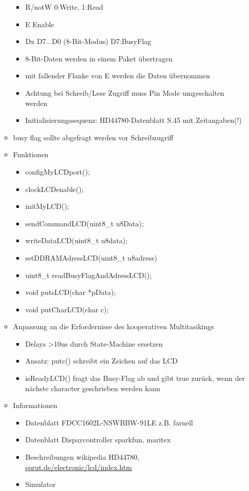 \begin{itemize}
\begin{itemize}
\begin{itemize}
			\item R/notW 0:Write, 1:Read
			\item E Enable
			\item Dx D7...D0 (8-Bit-Modus) D7:BusyFlag
			\item 8-Bit-Daten werden in einem Paket übertragen
			\item mit fallender Flanke von E werden die Daten übernommen
			\item Achtung bei Schreib/Lese Zugriff muss Pin Mode umgeschalten werden
			\item Initialisierungssequenz: HD44780-Datenblatt S.45 mit Zeitangaben(!)
		\end{itemize}
		\item busy flag sollte abgefragt werden vor Schreibzugriff
		\item Funktionen
		\begin{itemize}
			\item configMyLCDport();
			\item clockLCDenable();
			\item initMyLCD();
			\item sendCommandLCD(uint8\_t u8Data);
			\item writeDataLCD(uint8\_t u8data);
			\item setDDRAMAdressLCD(uint8\_t u8adress)
			\item uint8\_t readBusyFlagAndAdressLCD();
			\item void putsLCD(char *pData);
			\item void putCharLCD(char c);
		\end{itemize}
		\item Anpassung an die Erfordernisse des kooperativen Multitasikings
		\begin{itemize}
			\item Delays >10us durch State-Machine ersetzen
			\item Ansatz: putc() schreibt ein Zeichen auf das LCD
			\item isReadyLCD() fragt das Busy-Flag ab und gibt true zurück, wenn der nächste character geschrieben werden kann
		\end{itemize}
			\item Informationen
		\begin{itemize}
			\item Datenblatt FDCC1602L-NSWBBW-91LE z.B. farnell
			\item Datenblatt Dispaycontroller sparkfun, maritex
			\item Beschreibungen wikipedia HD44780, \url{sprut.de/electronic/lcd/index.htm}
			\item Simulator
		\end{itemize}
\end{itemize}
\end{itemize}

